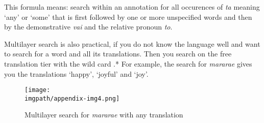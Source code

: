 This formula means: search within an annotation for all occurences of \textit{ta} meaning `any' or `some' that is first followed by one or more unspecified words and then by the demonstrative \textit{vai} and the relative pronoun \textit{to}. 

Multilayer search is also practical, if you do not know the language well and want to search for a word and all its translations. Then you search on the free translation tier with the wild card .* For example, the search for \textit{mararae} gives you the translations `happy', `joyful' and `joy'.

\begin{figure}[h]
\texttt{[image: \\imgpath/appendix-img4.png]}
\caption{Multilayer search for \textit{mararae} with any translation}
\end{figure}
